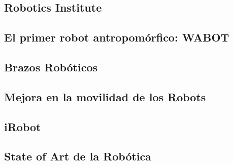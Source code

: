 \documentclass[a4paper,11pt]{article}
\begin{document}
\subsection{Robotics Institute}


\subsection{El primer robot antropomórfico: WABOT}


\subsection{Brazos Robóticos}


\subsection{Mejora en la movilidad de los Robots}


\subsection{iRobot}


\subsection{State of Art de la Robótica}


\normalsize


\onecolumn

%

\nocite{*}
\end{document}

